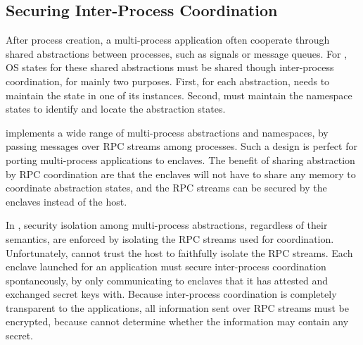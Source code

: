 \subsection{Securing Inter-Process Coordination}
\label{sec:graphene:multiproc:ipc}

After process creation, a multi-process application often cooperate
through shared abstractions between processes,
such as signals or message queues.
For \libos{}, OS states for these shared abstractions must be shared
though inter-process coordination, for mainly two purposes.
First, for each abstraction, \libos{} needs to maintain the state
in one of its instances.
Second, \libos{} must maintain the namespace states to identify and locate the
abstraction states.

\graphene{} implements a wide range of multi-process abstractions and namespaces,
by passing messages over RPC streams among processes.
Such a design is perfect for porting multi-process applications to enclaves.
The benefit of sharing abstraction by RPC coordination are that
the enclaves will not have to share any memory to
coordinate abstraction states,
and the RPC streams can be secured by the enclaves instead of the host.

In \graphene{}, security isolation among multi-process abstractions,
regardless of their semantics,
are enforced by isolating the RPC streams used for coordination.
Unfortunately, \sysname{} cannot trust the host to faithfully isolate
the RPC streams.
Each enclave launched for an application must secure inter-process coordination
spontaneously, by only communicating to enclaves that it has attested
and exchanged secret keys with.
Because inter-process coordination is completely transparent
to the applications,
all information sent over RPC streams must be encrypted,
because \libos{} cannot determine whether the information may contain any secret.





